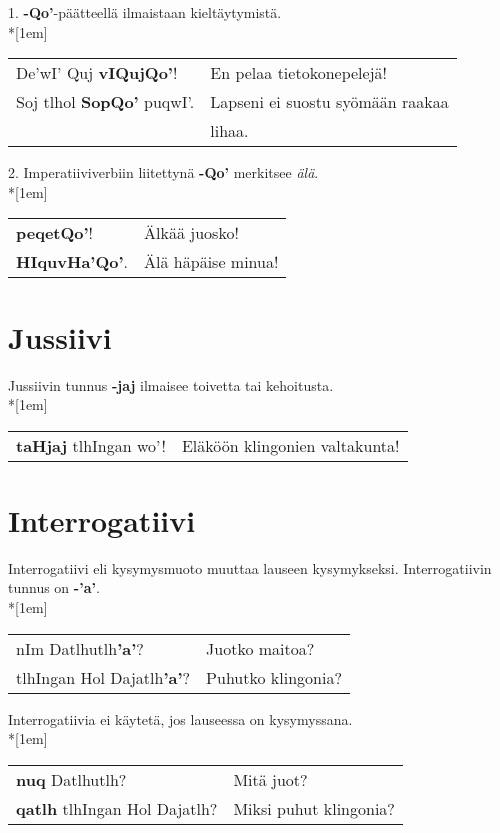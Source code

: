\documentclass{book}
\begin{document}
1. \textbf{-Qo'}-päätteellä ilmaistaan kieltäytymistä.\\*[1em]
\begin{tabular}{l l}
    De'wI' Quj \textbf{vIQujQo'}! & En pelaa tietokonepelejä! \\
    Soj tlhol \textbf{SopQo'} puqwI'. & Lapseni ei suostu syömään raakaa \\
    & lihaa. \\
\end{tabular}

2. Imperatiiviverbiin liitettynä \textbf{-Qo'} merkitsee \textit{älä}.
\\*[1em]
\begin{tabular}{l l}
    \textbf{peqetQo'}! & Älkää juosko! \\
    \textbf{HIquvHa'Qo'}. & Älä häpäise minua! \\
\end{tabular}

\section{Jussiivi}

Jussiivin tunnus \textbf{-jaj} ilmaisee toivetta tai kehoitusta.\\*[1em]
\begin{tabular}{l l}
    \textbf{taHjaj} tlhIngan wo'! & Eläköön klingonien valtakunta! \\
\end{tabular}

\section{Interrogatiivi}

Interrogatiivi eli kysymysmuoto muuttaa lauseen kysymykseksi.
Interrogatiivin tunnus on \textbf{-'a'}.
\\*[1em]
\begin{tabular}{l l}
    nIm Datlhutlh\textbf{'a'}? & Juotko maitoa? \\
    tlhIngan Hol Dajatlh\textbf{'a'}? & Puhutko klingonia? \\
\end{tabular}

Interrogatiivia ei käytetä, jos lauseessa on kysymyssana.\\*[1em]
\begin{tabular}{l l}
    \textbf{nuq} Datlhutlh? & Mitä juot? \\
    \textbf{qatlh} tlhIngan Hol Dajatlh? & Miksi puhut klingonia? \\
\end{tabular}
\end{document}
